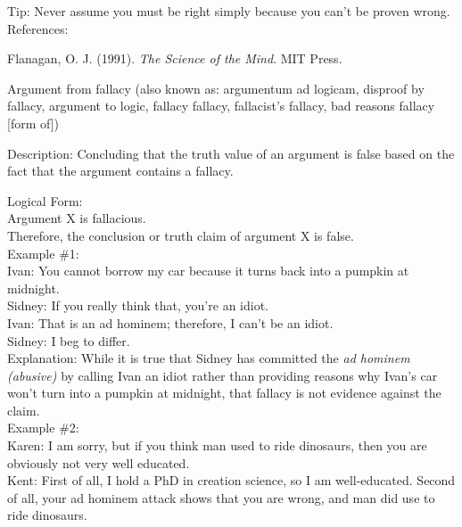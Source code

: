 \documentclass[a4paper,12pt,single,pdftex]{scrartcl}
\begin{document}
      
        Tip: Never assume you must be right simply because you can’t be proven wrong.
      \\

      References:

      
        Flanagan, O. J. (1991). {\it The Science of the Mind}. MIT Press.
      
    
  

Argument from fallacy
    (also known as: argumentum ad logicam, disproof by fallacy, argument to logic, fallacy fallacy, fallacist's fallacy, bad reasons fallacy [form of])
  
    Description: Concluding that the truth value of an argument is false based on the fact that the argument contains a fallacy.

    
      Logical Form:
    \\

    
      Argument X is fallacious.
    \\

    
      Therefore, the conclusion or truth claim of argument X is false.
    \\

    
      Example \#1:
    \\

    
      Ivan: You cannot borrow my car because it turns back into a pumpkin at midnight.
    \\

    
      Sidney: If you really think that, you’re an idiot.
    \\

    
      Ivan: That is an ad hominem; therefore, I can’t be an idiot.
    \\

    
      Sidney: I beg to differ.
    \\

    
      Explanation: While it is true that Sidney has committed the {\it ad hominem (abusive)} by calling Ivan an idiot rather than providing reasons why Ivan’s car won’t turn into a pumpkin at midnight, that fallacy is not evidence against the claim.
    \\

    
      Example \#2:
    \\

    
      Karen: I am sorry, but if you think man used to ride dinosaurs, then you are obviously not very well educated.
    \\

    
      Kent:  First of all, I hold a PhD in creation science, so I am well-educated.  Second of all, your ad hominem attack shows that you are wrong, and man did use to ride dinosaurs.
    \\
\end{document}

